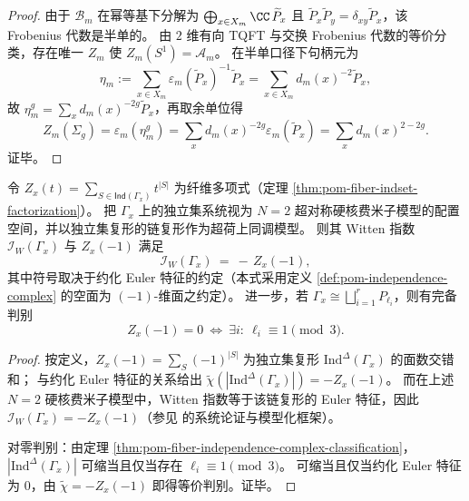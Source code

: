 \begin{proof}
由于 \(\mathcal B_m\) 在幂等基下分解为 \(\bigoplus_{x\in X_m}\CC\,\widetilde P_x\) 且 \(\widetilde P_x\widetilde P_y=\delta_{xy}\widetilde P_x\)，该 Frobenius 代数是半单的。
由 \(2\) 维有向 TQFT 与交换 Frobenius 代数的等价分类，存在唯一 \(Z_m\) 使 \(Z_m(S^1)=\mathcal A_m\)。
在半单口径下句柄元为
\[
\eta_m:=\sum_{x\in X_m}\varepsilon_m(\widetilde P_x)^{-1}\widetilde P_x=\sum_{x\in X_m}d_m(x)^{-2}\widetilde P_x,
\]
故 \(\eta_m^g=\sum_x d_m(x)^{-2g}\widetilde P_x\)，再取余单位得
\[
Z_m(\Sigma_g)=\varepsilon_m(\eta_m^g)=\sum_x d_m(x)^{-2g}\varepsilon_m(\widetilde P_x)=\sum_x d_m(x)^{2-2g}.
\]
证毕。
\end{proof}

\begin{proposition}\label{prop:pom-fiber-witten-index-zx-minus-one}
令 \(Z_x(t)=\sum_{S\in\mathsf{Ind}(\Gamma_x)}t^{|S|}\) 为纤维多项式（定理 \ref{thm:pom-fiber-indset-factorization}）。
把 \(\Gamma_x\) 上的独立集系统视为 \(N=2\) 超对称硬核费米子模型的配置空间，并以独立集复形的链复形作为超荷上同调模型。
则其 Witten 指数 \(\mathcal I_W(\Gamma_x)\) 与 \(Z_x(-1)\) 满足
\[
\mathcal I_W(\Gamma_x)\ =\ -\,Z_x(-1),
\]
其中符号取决于约化 Euler 特征的约定（本式采用定义 \ref{def:pom-independence-complex} 的空面为 \((-1)\)-维面之约定）。
进一步，若 \(\Gamma_x\cong\bigsqcup_{i=1}^r P_{\ell_i}\)，则有完备判别
\[
Z_x(-1)=0\ \Longleftrightarrow\ \exists i:\ \ell_i\equiv 1\pmod 3.
\]
\end{proposition}

\begin{proof}
按定义，\(Z_x(-1)=\sum_{S}(-1)^{|S|}\) 为独立集复形 \(\mathrm{Ind}^{\Delta}(\Gamma_x)\) 的面数交错和；
与约化 Euler 特征的关系给出
\(
\widetilde\chi(|\mathrm{Ind}^{\Delta}(\Gamma_x)|)=-Z_x(-1)
\)。
而在上述 \(N=2\) 硬核费米子模型中，Witten 指数等于该链复形的 Euler 特征，因此 \(\mathcal I_W(\Gamma_x)=-Z_x(-1)\)（参见 \cite{FendleySchoutensDeBoer2003LatticeModelsN2Supersymmetry} 的系统论证与模型化框架）。

对零判别：由定理 \ref{thm:pom-fiber-independence-complex-classification}，
\(|\mathrm{Ind}^{\Delta}(\Gamma_x)|\) 可缩当且仅当存在 \(\ell_i\equiv 1\pmod 3\)。
可缩当且仅当约化 Euler 特征为 \(0\)，由 \(\widetilde\chi=-Z_x(-1)\) 即得等价判别。证毕。
\end{proof}



